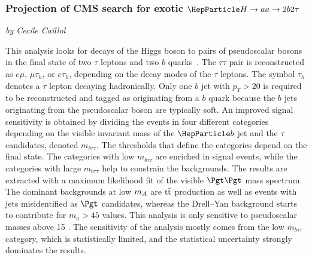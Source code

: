 
\subsubsection{Projection of CMS search for exotic $\PH\to aa \to 2b 2\tau$}\label{Sec:9.1.3}
\begin{center}
 {\it{ by Cecile Caillol}}
\end{center}

This analysis looks for decays of the Higgs boson to pairs of pseudoscalar bosons in the final state of two
$\tau$ leptons and two $b$ quarks~\cite{Sirunyan:2018pzn}. The $\tau\tau$ pair is reconstructed as $e\mu$, $\mu\tau_h$, or $e\tau_h$, depending on the decay modes of the $\tau$ leptons. The symbol $\tau_h$ denotes a $\tau$ lepton decaying hadronically.
Only one $b$ jet with $p_T>20$ \UGeV is required to be reconstructed and tagged as originating from a $b$ quark
because the $b$ jets originating from the pseudoscalar boson are typically soft.
An improved signal sensitivity is obtained by dividing the events in four different
categories depending on the visible invariant mass of the $\PQb$ jet and the $\tau$ candidates, denoted $m_{b\tau\tau}$.
 The thresholds that define the categories depend on the final state.
The categories with low $m_{b\tau\tau}$ are enriched in signal events, while the categories with large $m_{b\tau\tau}$ help to
constrain the backgrounds. The results are extracted with a maximum likelihood fit of the visible $\Pgt\Pgt$ mass spectrum.
The dominant backgrounds at low $m_{A}$ are $\text{t}\overline{\text{t}}$ production as well as events with jets misidentified as $\Pgt$
candidates, whereas the Drell--Yan background starts to contribute for $m_a>45$ \UGeV values. This analysis
is only sensitive to pseudoscalar masses above 15 \UGeV. The sensitivity of the analysis mostly comes from the low $m_{b\tau\tau}$
category, which is statistically limited, and the statistical uncertainty strongly dominates the results.


